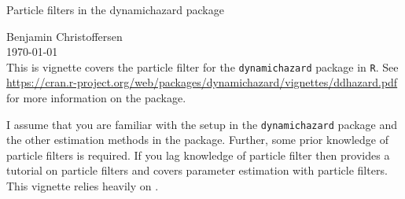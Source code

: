 \newcommand{\expec}[1]{\optor{\E}{#1}}
\newcommand{\expecC}[2]{\optorC{\E}{#1}{#2}}

\newcommand{\varp}[1]{\optor{\VAR}{#1}}
\newcommand{\varpC}[2]{\optorC{\VAR}{#1}{#2}}

\newcommand{\covp}[1]{\optor{\COV}{#1}}
\newcommand{\covpC}[2]{\optorC{\COV}{#1}{#2}}

\newcommand{\propAproxC}[2]{\optorC{\widetilde{p}}{#1}{#2}}

\newcommand{\dirac}[1]{\optor{\delta}{#1}}

\newcommand{\normal}[2]{\optor{\mathcal{N}}{#1,#2}}
\newcommand{\normalC}[3]{\optorC{\mathcal{N}}{#1}{#2,#3}}

\newcommand{\IDC}[2]{\optorC{q}{#1}{#2}}
\newcommand{\IDAproxC}[2]{\optorC{\widetilde{q}}{#1}{#2}}

\newcommand{\diag}[1]{\optor{\text{diag}}{#1}}

\newcommand{\KF}[3]{#1_{\left. #2 \right\vert #3}}
\newcommand{\KFSup}[4]{#1_{\left. #2 \right\vert #3}^{(#4)}}

\newcommand{\partic}[3]{#1_{#2}^{\Lparen{#3}}}
\newcommand{\particB}[3]{\widetilde{#1}_{#2}^{\Lparen{#3}}}
\newcommand{\particS}[3]{\widehat{#1}_{#2}^{\Lparen{#3}}}

\newcommand{\bigO}[1]{\mathcal{O}\Lparen{#1}}

\newcommand*{\myTitle}{\begingroup 
\centering 
{\LARGE Particle filters in the dynamichazard package} \\[\baselineskip]
\scshape

Benjamin Christoffersen \\[\baselineskip]
\today \\[\baselineskip]
\vspace*{3\baselineskip}
\endgroup}


\myTitle
This is vignette covers the particle filter for the \verb|dynamichazard| package in \verb|R|. See \url{https://cran.r-project.org/web/packages/dynamichazard/vignettes/ddhazard.pdf} for more information on the package.

I assume that you are familiar with the setup in the \verb|dynamichazard| package and the other estimation methods in the package. Further, some prior knowledge of particle filters is required.  If you lag knowledge of particle filter then \cite{doucet09} provides a tutorial on particle filters and \cite{kantas15} covers parameter estimation with particle filters. This vignette relies heavily on \cite{fearnhead10}.

